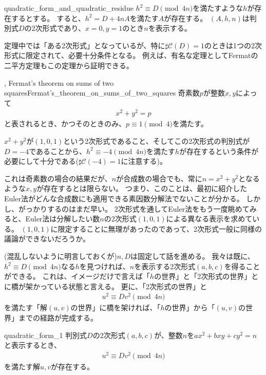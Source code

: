 \begin{thProof}{quadratic_form_and_quadratic_residue}
$h^2 \equiv D \pmod{4n}$を満たすような$h$が存在するとする。
すると、$h^2 = D + 4nA$を満たす$A$が存在する。
$(A,h,n)$は判別式$D$の2次形式であり、$x=0,y=1$のとき$n$を表示する。
\end{thProof}

定理中では「ある2次形式」となっているが、特に$\sharp\mathcal{C}(D)=1$のときは1つの2次形式に限定されて、必要十分条件となる。
例えば、有名な定理としてFermatの二平方定理もこの定理から証明できる。

\begin{Theo}{, Fermat's theorem on sums of two squares}{Fermat's_theorem_on_sums_of_two_squares}
奇素数$p$が整数$x,y$によって
\begin{align*}
x^2 + y^2 = p
\end{align*}
と表されるとき、かつそのときのみ、$p\equiv1\pmod{4}$を満たす。
\end{Theo}

$x^2+y^2$が$(1,0,1)$という2次形式であること、そしてこの2次形式の判別式が$D=-4$であることから、$h^2\equiv-4\pmod{4n}$を満たす$h$が存在するという条件が必要にして十分である($\sharp\mathcal{C}(-4)=1$に注意する)。

これは奇素数の場合の結果だが、$n$が合成数の場合でも、常に$n=x^2+y^2$となるような$x,y$が存在するとは限らない。
つまり、このことは、最初に紹介したEuler法がどんな合成数にも適用できる素因数分解法でないことが分かる。
しかし、がっかりするのはまだ早い。
2次形式を通してEuler法をもう一度眺めてみると、Euler法は分解したい数$n$の2次形式$(1,0,1)$による異なる表示を求めている。
$(1,0,1)$に限定することに無理があったのであって、2次形式一般に同様の議論ができないだろうか。

(混乱しないように明言しておくが)$n,D$は固定して話を進める。
我々は既に、$h^2\equiv D \pmod{4n}$なる$h$を見つければ、$n$を表示する2次形式$(a,b,c)$を得ることができる。
これは、イメージだけで言えば「$h$の世界」と「2次形式の世界」とに橋が架かっている状態と言える。
更に、「2次形式の世界」と
\begin{align*}
u^2 \equiv Dv^2 \pmod{4n}
\end{align*}
を満たす「解$(u,v)$の世界」に橋を架ければ、「$h$の世界」から「$(u,v)$の世界」までの経路が完成する。

\begin{Prop}{}{quadratic_form_1}
判別式$D$の2次形式$(a,b,c)$が、整数$n$を$ax^2+bxy+cy^2=n$と表示するとき、
\begin{align*}
u^2 \equiv Dv^2 \pmod{4n}
\end{align*}
を満たす解$u,v$が存在する。
\end{Prop}

